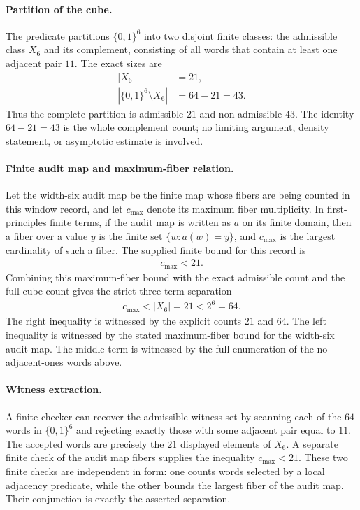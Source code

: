 \paragraph{Partition of the cube.}
The predicate partitions $\{0,1\}^6$ into two disjoint finite classes: the admissible class $X_6$ and its complement, consisting of all words that contain at least one adjacent pair $11$.  The exact sizes are
$$
\begin{aligned}
|X_6|&=21,\\
|\{0,1\}^6\setminus X_6|&=64-21=43.
\end{aligned}
$$
Thus the complete partition is admissible $21$ and non-admissible $43$.  The identity $64-21=43$ is the whole complement count; no limiting argument, density statement, or asymptotic estimate is involved.

\paragraph{Finite audit map and maximum-fiber relation.}
Let the width-six audit map be the finite map whose fibers are being counted in this window record, and let $c_{\max}$ denote its maximum fiber multiplicity.  In first-principles finite terms, if the audit map is written as $a$ on its finite domain, then a fiber over a value $y$ is the finite set $\{w : a(w)=y\}$, and $c_{\max}$ is the largest cardinality of such a fiber.  The supplied finite bound for this record is
$$
\begin{aligned}
c_{\max}<21.
\end{aligned}
$$
Combining this maximum-fiber bound with the exact admissible count and the full cube count gives the strict three-term separation
$$
\begin{aligned}
c_{\max}<|X_6|=21<2^6=64.
\end{aligned}
$$
The right inequality is witnessed by the explicit counts $21$ and $64$.  The left inequality is witnessed by the stated maximum-fiber bound for the width-six audit map.  The middle term is witnessed by the full enumeration of the no-adjacent-ones words above.

\paragraph{Witness extraction.}
A finite checker can recover the admissible witness set by scanning each of the $64$ words in $\{0,1\}^6$ and rejecting exactly those with some adjacent pair equal to $11$.  The accepted words are precisely the $21$ displayed elements of $X_6$.  A separate finite check of the audit map fibers supplies the inequality $c_{\max}<21$.  These two finite checks are independent in form: one counts words selected by a local adjacency predicate, while the other bounds the largest fiber of the audit map.  Their conjunction is exactly the asserted separation.

